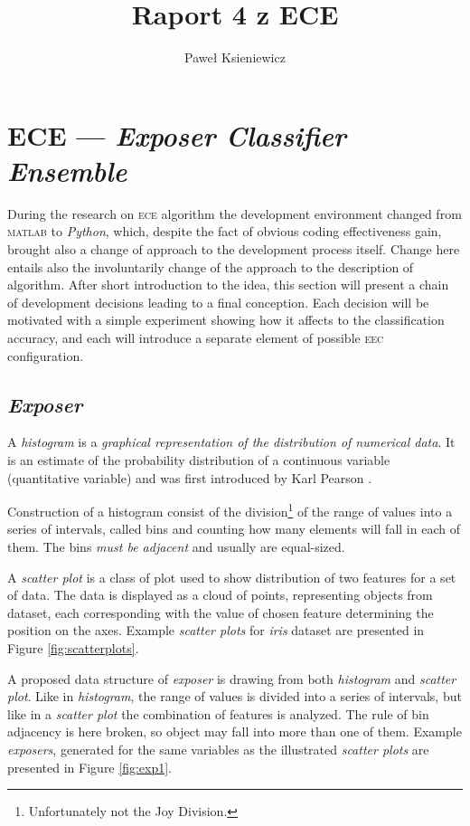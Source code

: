 \documentclass[]{article}
\title{Raport 4 z ECE}
\author{Paweł Ksieniewicz}
\begin{document}
\maketitle
\newpage

\section{ECE --- \emph{Exposer Classifier Ensemble}}

During the research on \textsc{ece} algorithm the development environment changed from \textsc{matlab} to \emph{Python}, which, despite the fact of obvious coding effectiveness gain, brought also a change of approach to the development process itself. Change here entails also the involuntarily change of the approach to the description of algorithm. After short introduction to the idea, this section will present a chain of development decisions leading to a final conception. Each decision will be motivated with a simple experiment showing how it affects to the classification accuracy, and each will introduce a separate element of possible \textsc{eec} configuration.

\subsection{\emph{Exposer}}
\label{exposer}

A \emph{histogram} is a \emph{graphical representation of the distribution of numerical data}. It is an estimate of the probability distribution of a continuous variable (quantitative variable) and was first introduced by Karl Pearson \cite{1895RSPTA.186..343P}. 

Construction of a histogram consist of the division\footnote{Unfortunately not the Joy Division.} of the range of values into a series of intervals, called bins and counting how many elements will fall in each of them. The bins \emph{must be adjacent} and usually are equal-sized.

A \emph{scatter plot} is a class of plot used to show distribution of two features for a set of data. The data is displayed as a cloud of points, representing objects from dataset, each corresponding with the value of chosen feature determining the position on the axes.\cite{jessica2005seeing} Example \emph{scatter plots} for \emph{iris} dataset are presented in Figure \ref{fig:scatterplots}.

A proposed data structure of \emph{exposer} is drawing from both \emph{histogram} and \emph{scatter plot}. Like in \emph{histogram}, the range of values is divided into a series of intervals, but like in a \emph{scatter plot} the combination of features is analyzed. The rule of bin adjacency is here broken, so object may fall into more than one of them. Example \emph{exposers}, generated for the same variables as the illustrated \emph{scatter plots} are presented in Figure \ref{fig:exp1}.
\end{document}
